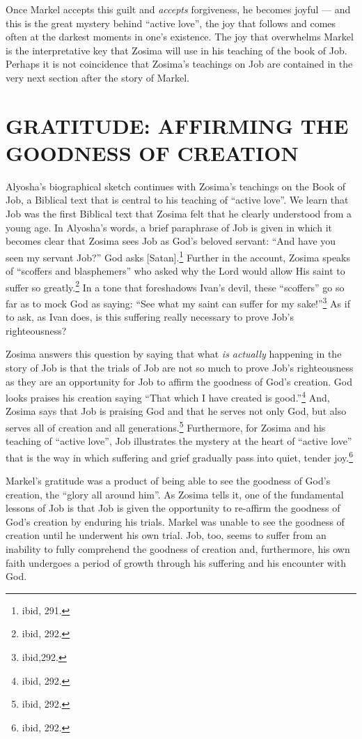        Once Markel accepts this guilt and \emph{accepts} forgiveness, he becomes joyful --- and this is the great mystery behind ``active love'', the joy that follows and comes often at the darkest moments in one's existence. The joy that overwhelms Markel is the interpretative key that Zosima will use in his teaching of the book of Job. Perhaps it is not coincidence that Zosima's teachings on Job are contained in the very next section after the story of Markel.
        
        
        \chapter{GRATITUDE: AFFIRMING THE GOODNESS OF CREATION}
        Alyosha's biographical sketch continues with Zosima's teachings on the Book of Job, a Biblical text that is central to his teaching of ``active love''. We learn that Job was the first Biblical text that Zosima felt that he clearly understood from a young age. In Alyosha's words, a brief paraphrase of Job is given in which it becomes clear that Zosima sees Job as God's beloved servant: ``And have you seen my servant Job?'' God asks [Satan].\footnote{ibid, 291.} Further in the account, Zosima speaks of ``scoffers and blasphemers'' who asked why the Lord would allow His saint to suffer so greatly.\footnote{ibid, 292.} In a tone that foreshadows Ivan's devil, these ``scoffers'' go so far as to mock God as saying: ``See what my saint can suffer for my sake!''\footnote{ibid,292.} As if to ask, as Ivan does, is this suffering really necessary to prove Job's righteousness?
        
        Zosima answers this question by saying that what \emph{is actually} happening in the story of Job is that the trials of Job are not so much to prove Job's righteousness as they are an opportunity for Job to affirm the goodness of God's creation. God looks praises his creation saying ``That which I have created is good.''\footnote{ibid, 292.} And, Zosima says that Job is praising God and that he serves not only God, but also serves all of creation and all generations.\footnote{ibid, 292.} Furthermore, for Zosima and his teaching of ``active love'', Job illustrates the mystery at the heart of ``active love'' that is the way in which suffering and grief gradually pass into quiet, tender joy.\footnote{ibid, 292.}
        
        Markel's gratitude was a product of being able to see the goodness of God's creation, the ``glory all around him''. As Zosima tells it, one of the fundamental lessons of Job is that Job is given the opportunity to re-affirm the goodness of God's creation by enduring his trials. Markel was unable to see the goodness of creation until he underwent his own trial. Job, too, seems to suffer from an inability to fully comprehend the goodness of creation and, furthermore, his own faith undergoes a period of growth through his suffering and his encounter with God.
        
